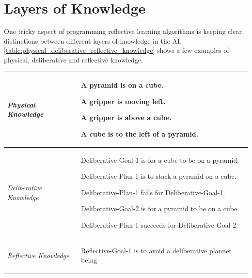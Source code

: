 \section{Layers of Knowledge}

One tricky aspect of programming reflective learning algorithms is
keeping clear distinctions between different layers of knowledge in
the AI.  {\autoref{table:physical_deliberative_reflective_knowledge}}
shows a few examples of physical, deliberative and reflective
knowledge.
\begin{table}
\centering
\begin{tabular}{|p{2cm}|p{10cm}|}
\hline \emph{Physical Knowledge} & \begin{packed_itemize}
\item{A pyramid is on a cube.}
\item{A gripper is moving left.}
\item{A gripper is above a cube.}
\item{A cube is to the left of a pyramid.}
\end{packed_itemize} \\
\hline \emph{Deliberative Knowledge} & \begin{packed_itemize}
\item{Deliberative-Goal-1 is for a cube to be on a pyramid.}
\item{Deliberative-Plan-1 is to stack a pyramid on a cube.}
\item{Deliberative-Plan-1 fails for Deliberative-Goal-1.}
\item{Deliberative-Goal-2 is for a pyramid to be on a cube.}
\item{Deliberative-Plan-1 succeeds for Deliberative-Goal-2.}
\end{packed_itemize} \\
\hline \emph{Reflective Knowledge}   & \begin{packed_itemize}
\item{Reflective-Goal-1 is to avoid a deliberative planner being
}
\end{packed_itemize}
\end{tabular}
\end{table}
